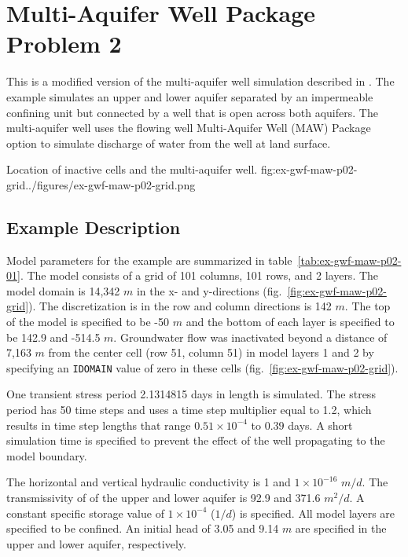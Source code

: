 \section{Multi-Aquifer Well Package Problem 2}

This is a modified version of the multi-aquifer well simulation described in \cite{nevilletonkin2004}. The example simulates an upper and lower aquifer separated by an impermeable confining unit but connected by a well that is open across both aquifers. The multi-aquifer well uses the flowing well Multi-Aquifer Well (MAW) Package option to simulate discharge of water from the well at land surface.                               

\begin{StandardFigure}{
                                     Location of inactive cells and the multi-aquifer well. 
                                     }{fig:ex-gwf-maw-p02-grid}{../figures/ex-gwf-maw-p02-grid.png}
\end{StandardFigure}   


\subsection{Example Description}
Model parameters for the example are summarized in table~\ref{tab:ex-gwf-maw-p02-01}.  The model consists of a grid of 101 columns, 101 rows, and 2 layers. The model domain is 14,342 $m$ in the x- and y-directions (fig.~\ref{fig:ex-gwf-maw-p02-grid}). The discretization is in the row and column directions is 142 $m$. The top of the model is specified to be -50 $m$ and the bottom of each layer is specified to be 142.9 and -514.5 $m$. Groundwater flow was inactivated beyond a distance of 7,163 $m$ from the center cell (row 51, column 51) in model layers 1 and 2 by specifying an \texttt{IDOMAIN} value of zero in these cells (fig.~\ref{fig:ex-gwf-maw-p02-grid}).

One transient stress period 2.1314815 days in length is simulated. The stress period has 50 time steps and uses a time step multiplier equal to 1.2, which results in time step lengths that range $0.51 \times 10^{-4}$ to $0.39$ days. A short simulation time is specified to prevent the effect of the well propagating to the model boundary.



The horizontal and vertical hydraulic conductivity is 1 and $1 \times 10^{-16}$ $m/d$. The transmissivity of of the upper and lower aquifer is 92.9 and 371.6 $m^2/d$. A constant specific storage value of $1 \times 10^{-4}$ ($1/d$) is specified. All model layers are specified to be confined. An initial head of 3.05 and 9.14 $m$ are specified in the upper and lower aquifer, respectively. 

